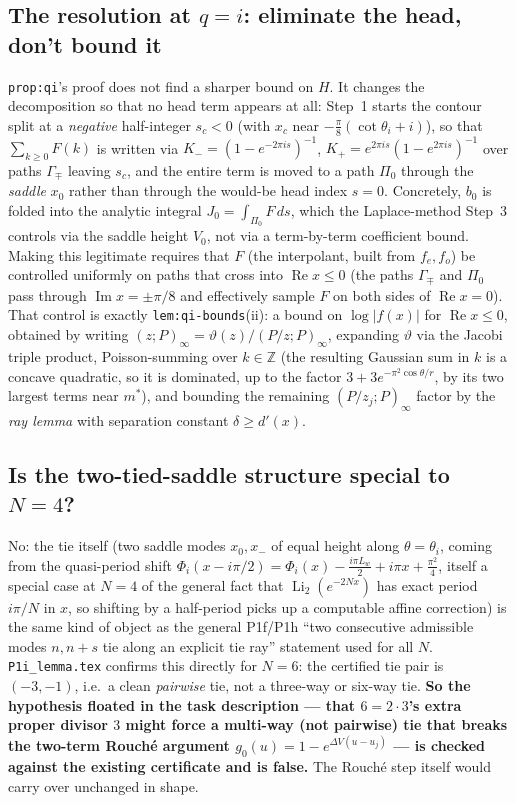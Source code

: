 \documentclass[11pt]{article}
\theoremstyle{plain}
\theoremstyle{remark}
\newcommand{\Li}{\operatorname{Li}_2}
\begin{document}
\subsection{The resolution at $q=i$: eliminate the head, don't bound it}
\texttt{prop:qi}'s proof does not find a sharper bound on $H$. It changes the decomposition so that no
head term appears at all: Step~1 starts the contour split at a \emph{negative} half-integer $s_c<0$ (with
$x_c$ near $-\frac\pi8(\cot\theta_i+i)$), so that $\sum_{k\ge0}F(k)$ is written via
$K_-=(1-e^{-2\pi is})^{-1}$, $K_+=e^{2\pi is}(1-e^{2\pi is})^{-1}$ over paths $\Gamma_\mp$ leaving $s_c$,
and the entire term is moved to a path $\Pi_0$ through the \emph{saddle} $x_0$ rather than through the
would-be head index $s=0$. Concretely, $b_0$ is folded into the analytic integral $J_0=\int_{\Pi_0}F\,ds$,
which the Laplace-method Step~3 controls via the saddle height $V_0$, not via a term-by-term coefficient
bound. Making this legitimate requires that $F$ (the interpolant, built from $f_e,f_o$) be controlled
uniformly on paths that cross into $\operatorname{Re}x\le0$ (the paths $\Gamma_\mp$ and $\Pi_0$ pass
through $\operatorname{Im}x=\pm\pi/8$ and effectively sample $F$ on both sides of $\operatorname{Re}x=0$).
That control is exactly \texttt{lem:qi-bounds}(ii): a bound on $\log|f(x)|$ for $\operatorname{Re}x\le0$,
obtained by writing $(z;P)_\infty=\vartheta(z)/(P/z;P)_\infty$, expanding $\vartheta$ via the Jacobi triple
product, Poisson-summing over $k\in\mathbb Z$ (the resulting Gaussian sum in $k$ is a concave quadratic,
so it is dominated, up to the factor $3+3e^{-\pi^2\cos\theta/r}$, by its two largest terms near
$m^\ast$), and bounding the remaining $(P/z_j;P)_\infty$ factor by the \emph{ray lemma} with separation
constant $\delta\ge d'(x)$.

\subsection{Is the two-tied-saddle structure special to $N=4$?}
No: the tie itself (two saddle modes $x_0,x_-$ of equal height along $\theta=\theta_i$, coming from the
quasi-period shift $\Phi_i(x-i\pi/2)=\Phi_i(x)-\frac{i\pi L_w}2+i\pi x+\frac{\pi^2}4$, itself a special
case at $N=4$ of the general fact that $\Li(e^{-2Nx})$ has exact period $i\pi/N$ in $x$, so shifting by a
half-period picks up a computable affine correction) is the same kind of object as the general P1f/P1h
``two consecutive admissible modes $n,n+s$ tie along an explicit tie ray'' statement used for all $N$.
\texttt{P1i\_lemma.tex} confirms this directly for $N=6$: the certified tie pair is $(-3,-1)$, i.e.\ a
clean \emph{pairwise} tie, not a three-way or six-way tie. \textbf{So the hypothesis floated in the task
description --- that $6=2\cdot3$'s extra proper divisor $3$ might force a multi-way (not pairwise) tie
that breaks the two-term Rouch\'e argument $g_0(u)=1-e^{\Delta V(u-u_j)}$ --- is checked against the
existing certificate and is false.} The Rouch\'e step itself would carry over unchanged in shape.
\end{document}
